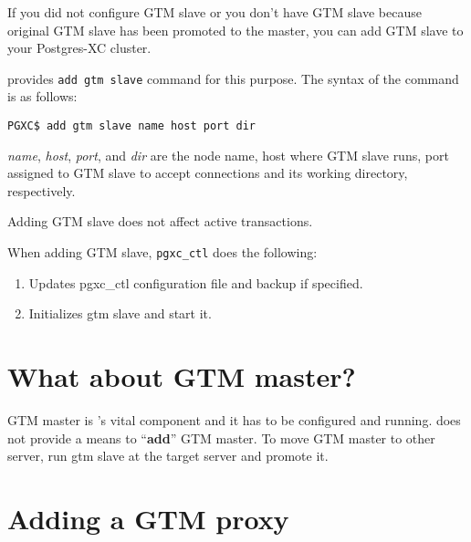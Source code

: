   If you did not configure GTM slave or you don't have GTM slave because original GTM slave has
  been promoted to the master, you can add GTM slave to your Postgres-XC cluster.
  
   provides \texttt{add gtm slave} command for this purpose.
  The syntax of the command is as follows:
  
  \vspace{\parskip}
  \begin{lstlisting}[basicstyle=\ttfamily\normalsize,frame=single]
PGXC$ add gtm slave name host port dir
  \end{lstlisting}
  
  {\it name}, {\it host}, {\it port}, and {\it dir} are the node name, host where GTM slave
  runs, port assigned to GTM slave to accept connections and its working directory, respectively.
  
  Adding GTM slave does not affect active transactions.
  
  When adding GTM slave, \verb|pgxc_ctl| does the following:
  
  \begin{enumerate}
	  \item Updates pgxc\_ctl configuration file and backup if specified.
	  \item Initializes gtm slave and start it.
  \end{enumerate}



\section{What about GTM master?}

  GTM master is \XC's vital component and it has to be configured and running.
   does not provide a means to ``\textbf{add}'' GTM master.
  To move GTM master to other server, run gtm slave at the target server and promote it.
  


\section{\label{pgxcCtl:gtmProxyAddition}Adding a GTM proxy}
  
